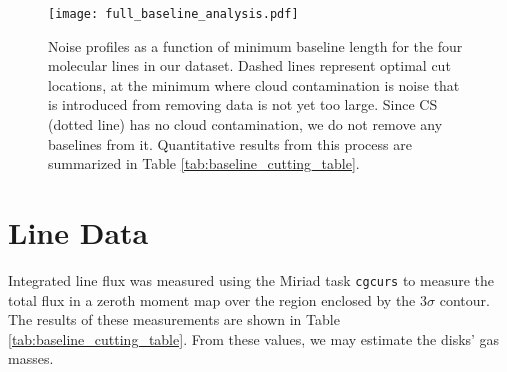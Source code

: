 

\begin{figure}[t]
  \texttt{[image: full\_baseline\_analysis.pdf]}%
  \caption{Noise profiles as a function of minimum baseline length for the four molecular lines in our dataset. Dashed lines represent optimal cut locations, at the minimum where cloud contamination is noise that is introduced from removing data is not yet too large. Since CS (dotted line) has no cloud contamination, we do not remove any baselines from it. Quantitative results from this process are summarized in Table \ref{tab:baseline_cutting_table}.}
  \label{fig:noise_profiles}
\end{figure}





\section{Line Data}
\label{section:line_data}

Integrated line flux was measured using the Miriad task \texttt{cgcurs} to measure the total flux in a zeroth moment map over the region enclosed by the 3$\sigma$ contour. The results of these measurements are shown in Table \ref{tab:baseline_cutting_table}. From these values, we may estimate the disks' gas masses.


